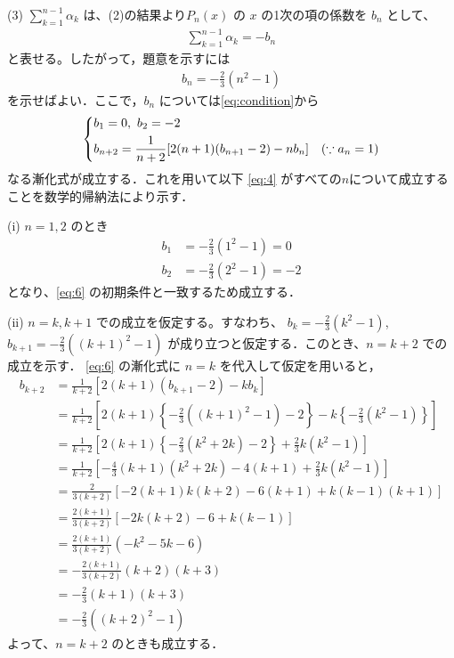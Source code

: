 \documentclass[a4paper,10pt]{ltjsarticle}
\begin{document}
\begin{multicols}{2}
\vspace{10pt}
(3)
$\displaystyle \sum_{k=1}^{n-1} \alpha_k$ は、(2)の結果より$P_n(x)$ の $x$ の1次の項の係数を $b_n$ として、
\begin{align}\label{eq:5}
\sum_{k=1}^{n-1} \alpha_k = -b_n 
\end{align}
と表せる。したがって，題意を示すには
\begin{align}\label{eq:4}
b_n = -\frac{2}{3}(n^2 - 1)
\end{align}
を示せばよい．ここで，$b_n$ については\cref{eq:condition}から
\begin{align}\label{eq:6}
\begin{dcases}
b_1 = 0, \ b_2 = -2 \\
b_{n+2} = \frac{1}{n+2} [2(n+1)(b_{n+1} - 2) - n b_n] \quad (\because a_n=1)
\end{dcases}
\end{align}
なる漸化式が成立する．これを用いて以下 \cref{eq:4} がすべての$n$について成立することを数学的帰納法により示す．

\vspace{10pt}
(i) $n=1, 2$ のとき
\begin{align*}
b_1 &= -\frac{2}{3}(1^2-1) = 0 \\
b_2 &= -\frac{2}{3}(2^2-1) = -2  
\end{align*}
となり、\cref{eq:6} の初期条件と一致するため成立する．

\vspace{10pt}
(ii) $n=k, k+1$ での成立を仮定する。すなわち、
$b_k = -\frac{2}{3}(k^2 - 1)$, $b_{k+1} = -\frac{2}{3}((k+1)^2 - 1)$
が成り立つと仮定する．このとき、$n=k+2$ での成立を示す．
\cref{eq:6} の漸化式に $n=k$ を代入して仮定を用いると，
\begin{align*}
b_{k+2} 
&= \frac{1}{k+2} \left[ 2(k+1)(b_{k+1} - 2) - k b_k \right] \\
&= \frac{1}{k+2} \left[ 2(k+1) \left\{ -\frac{2}{3}((k+1)^2 - 1) - 2 \right\} - k \left\{ -\frac{2}{3}(k^2 - 1) \right\} \right] \\
&= \frac{1}{k+2} \left[ 2(k+1) \left\{ -\frac{2}{3}(k^2+2k) - 2 \right\} + \frac{2}{3}k(k^2 - 1) \right] \\
&= \frac{1}{k+2} \left[ -\frac{4}{3}(k+1)(k^2+2k) - 4(k+1) + \frac{2}{3}k(k^2-1) \right] \\
&= \frac{2}{3(k+2)} \left[ -2(k+1)k(k+2) - 6(k+1) + k(k-1)(k+1) \right] \\
&= \frac{2(k+1)}{3(k+2)} \left[ -2k(k+2) - 6 + k(k-1) \right] \\
&= \frac{2(k+1)}{3(k+2)} (-k^2 - 5k - 6) \\
&= -\frac{2(k+1)}{3(k+2)} (k+2)(k+3) \\
&= -\frac{2}{3}(k+1)(k+3) \\
&= -\frac{2}{3}((k+2)^2 - 1)
\end{align*}
よって、$n=k+2$ のときも成立する．


\end{multicols}
\end{document}

